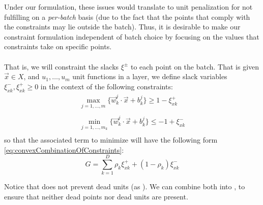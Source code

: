 Under our formulation,  these issues would translate to unit penalization for not fulfilling \SepUnit on a \emph{per-batch} basis (due to the fact that the points that comply with the constraints may lie outside the batch).  Thus, it is desirable to make our constraint formulation independent of batch choice by focusing on the values that constraints take on specific points. 
\\\\
That is, we will constraint the slacks $\xi^{\pm}$ to each point on the batch. That is given $\vec{x}\in X$, and $u_1,\ldots,u_m$ unit functions in a layer, we define slack variables $\xi^{-}_{xk},\xi^{+}_{xk}\geq 0$ in the context of the following constraints:
\begin{equation}\label{eq:pointSeparationConstraint}
\begin{array}{lcl}
    \displaystyle\max_{j=1,\ldots,m}\{\vec{w}^j_k\cdot\vec{x}+b^j_k\}\geq 1-\xi^{+}_{xk}\\\\
    \displaystyle\min_{j=1,\ldots,m_k}\{\vec{w}^j_k\cdot\vec{x}+b^j_k\}\leq -1+\xi^{-}_{xk}\\
\end{array}    
\end{equation}
so that the associated term to minimize will have the following form \ref{eq:convexCombinationOfConstraints}:
\begin{equation}\label{eq:convexCombinationOfConstraints}
    G = \sum_{k=1}^{D}\rho_{k}\xi^{+}_{xk}+(1-\rho_{k})\xi^{-}_{xk}
\end{equation}

Notice that \SepPoint does not prevent  dead units (as \SepUnit). We can combine both into \SepUnitPoint, to ensure that neither dead points nor dead units are present. 